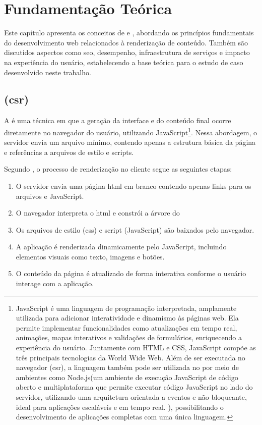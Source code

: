 \chapter{Fundamentação Teórica}
\label{cap:fundamentacao}

Este capítulo apresenta os conceitos de  e , abordando os princípios fundamentais do desenvolvimento web relacionados à renderização de conteúdo. Também são discutidos aspectos como \acrshort{seo}, desempenho, infraestrutura de serviços e impacto na experiência do usuário, estabelecendo a base teórica para o estudo de caso desenvolvido neste trabalho.

\section{ (\acrshort{csr})}
\label{subsec:csr}

A \textbf{} é uma técnica em que a geração da interface e do conteúdo final ocorre diretamente no navegador do usuário, utilizando JavaScript\footnote{JavaScript é uma linguagem de programação interpretada, amplamente utilizada para adicionar interatividade e dinamismo às páginas web. Ela permite implementar funcionalidades como atualizações em tempo real, animações, mapas interativos e validações de formulários, enriquecendo a experiência do usuário. Juntamente com HTML e CSS, JavaScript compõe as três principais tecnologias da World Wide Web. Além de ser executada no navegador (\acrshort{csr}), a linguagem também pode ser utilizada no  por meio de ambientes como Node.js(um ambiente de execução JavaScript de código aberto e multiplataforma que permite executar código JavaScript no lado do servidor, utilizando uma arquitetura orientada a eventos e não bloqueante, ideal para aplicações escaláveis e em tempo real.\cite{nodejs2025} ), possibilitando o desenvolvimento de aplicações completas com uma única linguagem.\cite{js2025}}. Nessa abordagem, o servidor envia um arquivo  mínimo, contendo apenas a estrutura básica da página e referências a arquivos de estilo e scripts.{\cite{atori2024}}

Segundo , o processo de renderização no cliente segue as seguintes etapas:

\begin{enumerate}
    \item O servidor envia uma página \acrshort{html} em branco contendo apenas links para os arquivos  e JavaScript.
    \item O navegador interpreta o \acrshort{html} e constrói a árvore do 
    \item Os arquivos de estilo (\acrshort{css}) e script (JavaScript) são baixados pelo navegador.
    \item A aplicação é renderizada dinamicamente pelo JavaScript, incluindo elementos visuais como texto, imagens e botões.
    \item O conteúdo da página é atualizado de forma interativa conforme o usuário interage com a aplicação.
\end{enumerate}


